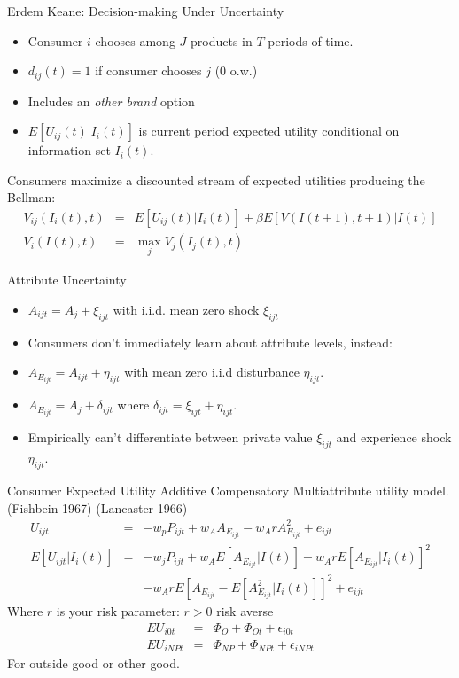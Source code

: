 \documentclass[xcolor=pdftex,dvipsnames,table,mathserif]{beamer}
\begin{document}
\begin{frame}{Erdem Keane: Decision-making Under Uncertainty}
\begin{itemize}
\item Consumer $i$ chooses among $J$ products in $T$ periods of time.
\item $d_{ij}(t)=1$ if consumer chooses $j$ (0 o.w.)
\item Includes an \textit{other brand} option
\item $E[U_{ij}(t) | I_i(t)]$ is current period expected utility conditional on information set $I_i(t)$.
\end{itemize}
Consumers maximize a discounted stream of expected utilities producing the Bellman:
\begin{eqnarray*}
V_{ij}(I_i(t),t) &=& E[U_{ij}(t) | I_i(t)] + \beta E[V(I(t+1),t+1) | I(t)] \\
V_i(I(t),t) &=& \max_j V_j(I_j(t),t)
\end{eqnarray*}
\end{frame}


\begin{frame}{Attribute Uncertainty}
\begin{itemize}
\item $A_{ijt} = A_j + \xi_{ijt} $ with i.i.d. mean zero shock $\xi_{ijt}$
\item Consumers don't immediately learn about attribute levels, instead:
\item $A_{E_{ijt}} = A_{ijt} + \eta_{ijt}$ with mean zero i.i.d disturbance $\eta_{ijt}$.
\item $A_{E_{ijt}} = A_{j} + \delta_{ijt}$ where $\delta_{ijt} = \xi_{ijt} + \eta_{ijt}$.
\item Empirically can't differentiate between private value $\xi_{ijt}$ and experience shock $\eta_{ijt}$.
\end{itemize}
\end{frame}

\begin{frame}{Consumer Expected Utility}
Additive Compensatory Multiattribute utility model. (Fishbein 1967) (Lancaster 1966)
\begin{eqnarray*}
U_{ijt} &=& -w_p P_{ijt} + w_A A_{E_{ijt}} - w_A r A_{E_{ijt}}^2 + e_{ijt}\\
E[U_{ijt} | I_i(t)] &=& -w_j P_{ijt} + w_A E[A_{E_{ijt}} | I(t)] - w_A r E [A_{E_{ijt}} | I_i(t)]^2\\
&&-w_A r E[A_{E_{ijt}} - E[A_{E_{ijt}}^2 | I_i(t)]]^2 + e_{ijt}
\end{eqnarray*}
Where $r$ is your risk parameter:  $r > 0$ risk averse
\begin{eqnarray*}
EU_{i0t}  &=& \Phi_{O} + \Phi_{Ot} + \epsilon_{i0t}\\
EU_{iNPt}  &=& \Phi_{NP} + \Phi_{NPt} + \epsilon_{iNPt}
\end{eqnarray*}
For outside good or other good.
\end{frame}
\end{document}
